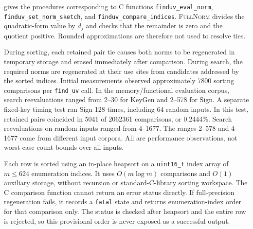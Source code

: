 \documentclass[a4paper,10pt]{article}
\theoremstyle{definition}
\theoremstyle{remark}
\begin{document}
 gives the procedures corresponding to C functions \texttt{finduv\_eval\_norm}, \texttt{finduv\_\allowbreak set\_\allowbreak norm\_\allowbreak sketch}, and \texttt{finduv\_compare\_indices}. \textsc{FullNorm} divides the quadratic-form value by $d_j$ and checks that the remainder is zero and the quotient positive. Rounded approximations are therefore not used to resolve ties.

During sorting, each retained pair tie causes both norms to be regenerated in temporary storage and erased immediately after comparison. During search, the required norms are regenerated at their use sites from candidates addressed by the sorted indices. Initial measurements observed approximately \num{7800} sorting comparisons per \texttt{find\_uv} call. In the memory/functional evaluation corpus, search reevaluations ranged from 2--30 for KeyGen and 2--578 for Sign. A separate fixed-key timing test ran Sign 128 times, including 64 random inputs. In this test, retained pairs coincided in \num{5041} of \num{2062361} comparisons, or \num{0.2444}\%. Search reevaluations on random inputs ranged from 4--1677. The ranges 2--578 and 4--1677 come from different input corpora. All are performance observations, not worst-case count bounds over all inputs.

Each row is sorted using an in-place heapsort on a \texttt{uint16\_t} index array of $m\leq624$ enumeration indices. It uses $O(m\log m)$ comparisons and $O(1)$ auxiliary storage, without recursion or standard-C-library sorting workspace. The C comparison function cannot return an error status directly. If full-precision regeneration fails, it records a \texttt{fatal} state and returns enumeration-index order for that comparison only. The status is checked after heapsort and the entire row is rejected, so this provisional order is never exposed as a successful output.
\end{document}
